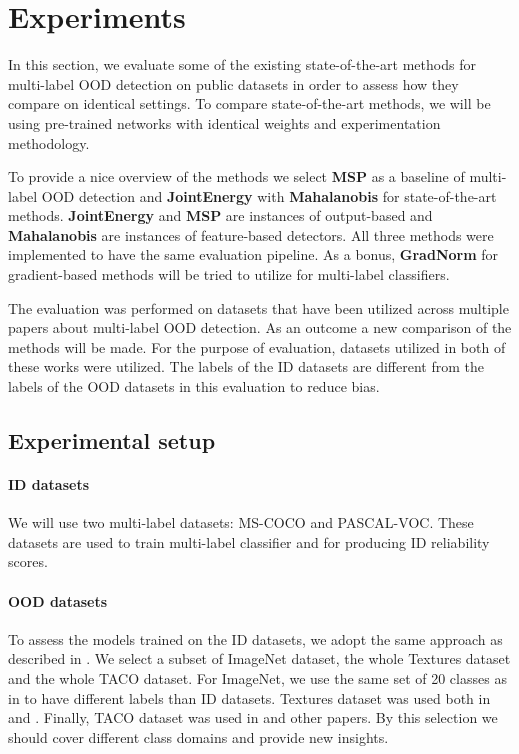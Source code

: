 \section{Experiments}
In this section, we evaluate some of the existing state-of-the-art methods for multi-label OOD detection
 on public datasets in order to assess how they compare on identical settings. 
 To compare state-of-the-art methods, we will be using pre-trained networks with identical weights and experimentation methodology.

To provide a nice overview of the methods we select \textbf{MSP} as a baseline of multi-label OOD detection and \textbf{JointEnergy} with \textbf{Mahalanobis} for state-of-the-art methods.
\textbf{JointEnergy} and \textbf{MSP} are instances of output-based and \textbf{Mahalanobis} are instances of feature-based detectors.
All three methods were implemented to have the same evaluation pipeline. 
As a bonus, \textbf{GradNorm} for gradient-based methods will be tried to utilize for multi-label classifiers.

The evaluation was performed on datasets that have been utilized across multiple papers about multi-label OOD detection. 
As an outcome a new comparison of the methods will be made. 
For the purpose of evaluation, datasets utilized in both of these works were utilized. 
The labels of the ID datasets are different from the labels of the OOD datasets in this evaluation to reduce bias.

\subsection{Experimental setup}
\paragraph{ID datasets}
We will use two multi-label datasets: MS-COCO\cite{linMicrosoftCOCOCommon2015} and PASCAL-VOC\cite{everinghamPascalVisualObject2015}. 
These datasets are used to train multi-label classifier and for producing ID reliability scores. 

\paragraph{OOD datasets}
To assess the models trained on the ID datasets, we adopt the same approach as described in \cite{Wang2021}. 
We select a subset of ImageNet\cite{dengImageNetLargescaleHierarchical2009} dataset, the whole Textures\cite{cimpoiDescribingTexturesWild2013} dataset and the whole TACO\cite{proencaTACOTrashAnnotations2020} dataset.
For ImageNet, we use the same set of 20 classes as in \cite{Wang2021} to have different labels than ID datasets.
Textures dataset was used both in \cite{Wang2021} and \cite{huangImportanceGradientsDetecting2021}.
Finally, TACO dataset was used in \cite{Zolfi2022} and other papers.
By this selection we should cover different class domains and provide new insights.

